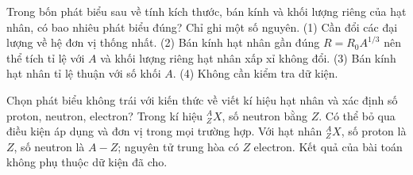 \begin{ex}
Trong bốn phát biểu sau về tính kích thước, bán kính và khối lượng riêng của hạt nhân, có bao nhiêu phát biểu đúng? Chỉ ghi một số nguyên. (1) Cần đổi các đại lượng về hệ đơn vị thống nhất. (2) Bán kính hạt nhân gần đúng $R=R_0A^{1/3}$ nên thể tích tỉ lệ với $A$ và khối lượng riêng hạt nhân xấp xỉ không đổi. (3) Bán kính hạt nhân tỉ lệ thuận với số khối $A$. (4) Không cần kiểm tra dữ kiện.
\end{ex}

\begin{ex}
Chọn phát biểu không trái với kiến thức về viết kí hiệu hạt nhân và xác định số proton, neutron, electron?
\choice
{Trong kí hiệu $^{A}_{Z}X$, số neutron bằng $Z$.}
{Có thể bỏ qua điều kiện áp dụng và đơn vị trong mọi trường hợp.}
{\True Với hạt nhân $^{A}_{Z}X$, số proton là $Z$, số neutron là $A-Z$; nguyên tử trung hòa có $Z$ electron.}
{Kết quả của bài toán không phụ thuộc dữ kiện đã cho.}
\end{ex}

